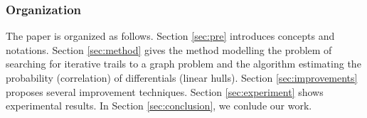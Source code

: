 \begin{enumerate}
\end{enumerate}

\subsubsection{Organization}
The paper is organized as follows. Section \ref{sec:pre} introduces concepts and notations. Section \ref{sec:method} gives the method modelling the problem of searching for iterative trails to a graph problem and the algorithm estimating the probability (correlation) of differentials (linear hulls). Section \ref{sec:improvements} proposes several improvement techniques. Section \ref{sec:experiment} shows experimental results. In Section \ref{sec:conclusion}, we conlude our work.
